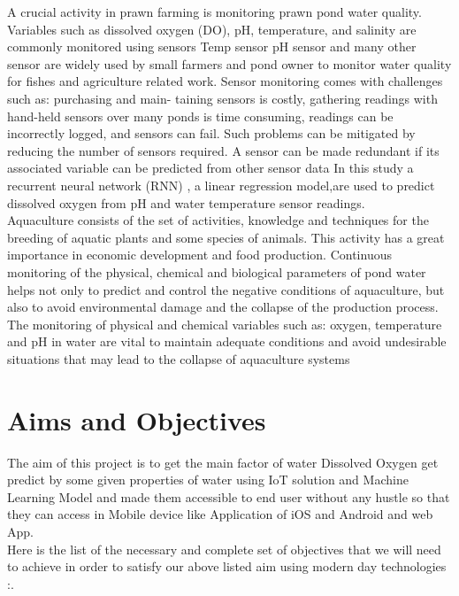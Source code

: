 
A crucial activity in prawn farming is monitoring prawn pond water quality. Variables such as dissolved oxygen (DO), pH, temperature, and salinity are commonly monitored using sensors Temp sensor pH sensor and many other sensor are widely used by small farmers and pond owner to monitor water quality for fishes and agriculture related work. Sensor monitoring comes with challenges such as: purchasing and main- taining sensors is costly, gathering readings with hand-held sensors over many ponds is time consuming, readings can be incorrectly logged, and sensors can fail. Such problems can be mitigated by reducing the number of sensors required. A sensor can be made redundant if its associated variable can be predicted from other sensor data In this study a recurrent neural network (RNN) , a linear regression model,are used to predict dissolved oxygen from pH and water temperature sensor readings.\\

Aquaculture consists of the set of activities, knowledge and techniques for the breeding of aquatic plants and some species of animals. This activity has a great importance in economic development and food production. Continuous monitoring of the physical, chemical and biological parameters of pond water helps not only to predict and control the negative conditions of aquaculture, but also to avoid environmental damage and the collapse of the production process. The monitoring of physical and chemical variables such as: oxygen, temperature and pH in water are vital to maintain adequate conditions and avoid undesirable situations that may lead to the collapse of aquaculture systems


\section{Aims and Objectives}

The aim of this project is to get the main factor of water Dissolved Oxygen get predict by some given properties of water using IoT solution and Machine Learning Model and made them accessible to end user without any hustle so that they can access in Mobile device like Application of iOS and Android and web App.\\


Here is the list of the necessary and complete set of objectives that we will need to achieve in order to satisfy our above listed aim using modern day technologies :. 

